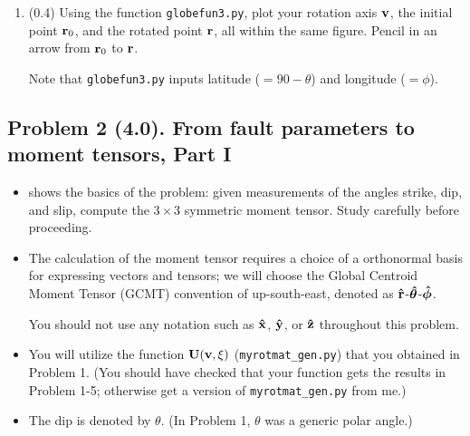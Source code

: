 \documentclass[11pt,titlepage,fleqn]{article}
\newcommand{\rotangB}{\xi}    %
\newcommand{\rotvec}{\bv}      %
\begin{document}
\begin{enumerate}
\item (0.4) Using the function \verb+globefun3.py+, plot your rotation axis $\rotvec$, the initial point $\mbox{${\bf r}$}_0$, and the rotated point $\mbox{${\bf r}$}$, all within the same figure. Pencil in an arrow from $\mbox{${\bf r}$}_0$ to $\mbox{${\bf r}$}$.

Note that \verb+globefun3.py+ inputs latitude ($=90-\theta$) and longitude ($=\phi$).

\end{enumerate}


\subsection*{Problem 2 (4.0). From fault parameters to moment tensors, Part I}

\begin{itemize}
\item {} shows the basics of the problem: given measurements of the angles strike, dip, and slip, compute the $3 \times 3$ symmetric moment tensor. Study  carefully before proceeding.

\item The calculation of the moment tensor requires a choice of a orthonormal basis for expressing vectors and tensors; we will choose the Global Centroid Moment Tensor (GCMT) convention of up-south-east, denoted as $\mbox{\boldmath{$\hat{\rm r}$}}$-$\mbox{\boldmath{$\hat{\theta}$}}$-$\mbox{\boldmath{$\hat{\phi}$}}$.

You should not use any notation such as $\mbox{\boldmath{$\hat{\rm x}$}}$, $\mbox{\boldmath{$\hat{\rm y}$}}$, or $\mbox{\boldmath{$\hat{\rm z}$}}$ throughout this problem.

\item You will utilize the function $\bU(\rotvec,\rotangB)$ (\verb+myrotmat_gen.py+) that you obtained in Problem 1. (You should have checked that your function gets the results in Problem 1-5; otherwise get a version of \verb+myrotmat_gen.py+ from me.)

\item The dip is denoted by $\theta$. (In Problem 1, $\theta$ was a generic polar angle.)

\end{itemize}
\end{document}
